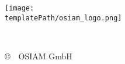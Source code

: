 
% 
\begin{titlepage}

\begin{center}
\texttt{[image: \\templatePath/osiam\_logo.png]} 
\vspace*{0.17\paperheight}

\begin{Huge}
\textsf{\textbf{\documenttitle}}
\end{Huge}
\vspace*{0.17\paperheight}\\
\begin{Large}
\copyright~\the\year~OSIAM GmbH\\
\end{Large}

\end{center}



\end{titlepage} 

\thispagestyle{empty}

